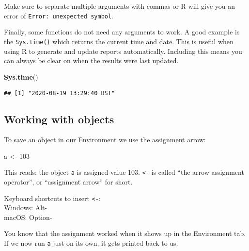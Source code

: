 \documentclass[
  12pt,
  krantz2]{krantz}
\makeatletter
\newenvironment{Shaded}{\begin{snugshade}}{\end{snugshade}}
\newcommand{\DecValTok}[1]{\textcolor[rgb]{0.00,0.00,0.81}{#1}}
\newcommand{\KeywordTok}[1]{\textcolor[rgb]{0.13,0.29,0.53}{\textbf{#1}}}
\newcommand{\NormalTok}[1]{#1}
\newcommand{\StringTok}[1]{\textcolor[rgb]{0.31,0.60,0.02}{#1}}
\renewenvironment{quote}{\begin{VF}}{\end{VF}}
\newenvironment{kframe}{%
\medskip{}
\setlength{\fboxsep}{.8em}
 \def\at@end@of@kframe{}%
 \ifinner\ifhmode%
  \def\at@end@of@kframe{\end{minipage}}%
  \begin{minipage}{\columnwidth}%
 \fi\fi%
 \def\FrameCommand##1{\hskip\@totalleftmargin \hskip-\fboxsep
 \colorbox{shadecolor}{##1}\hskip-\fboxsep
     \hskip-\linewidth \hskip-\@totalleftmargin \hskip\columnwidth}%
 \MakeFramed {\advance\hsize-\width
   \@totalleftmargin\z@ \linewidth\hsize
   \@setminipage}}%
 {\par\unskip\endMakeFramed%
 \at@end@of@kframe}
\renewenvironment{Shaded}{\begin{kframe}}{\end{kframe}}
\makeatother
\begin{document}
\begin{quote}
Make sure to separate multiple arguments with commas or R will give you an error of \texttt{Error:\ unexpected\ symbol}.
\end{quote}

Finally, some functions do not need any arguments to work.
A good example is the \texttt{Sys.time()} which returns the current time and date.
This is useful when using R to generate and update reports automatically.
Including this means you can always be clear on when the results were last updated.


\begin{Shaded}
\begin{Highlighting}[]
\KeywordTok{Sys.time}\NormalTok{()}
\end{Highlighting}
\end{Shaded}

\begin{verbatim}
## [1] "2020-08-19 13:29:40 BST"
\end{verbatim}

\hypertarget{working-with-objects}{%
\subsection{Working with objects}\label{working-with-objects}}

To save an object in our Environment we use the assignment arrow:

\begin{Shaded}
\begin{Highlighting}[]
\NormalTok{a <-}\StringTok{ }\DecValTok{103}
\end{Highlighting}
\end{Shaded}

This reads: the object \texttt{a} is assigned value 103.
\texttt{\textless{}-} is called ``the arrow assignment operator'', or ``assignment arrow'' for short.

\begin{quote}
Keyboard shortcuts to insert \texttt{\textless{}-}:\\
Windows: Alt-\\
macOS: Option-
\end{quote}

You know that the assignment worked when it shows up in the Environment tab.
If we now run \texttt{a} just on its own, it gets printed back to us:
\end{document}
